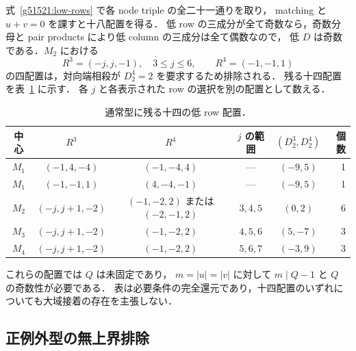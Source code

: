 式~\eqref{g51521:low-rows} で各 node triple の全二十一通りを取り，
matching と $u+v=0$ を課すと十八配置を得る．
低 row の三成分が全て奇数なら，奇数分母と pair products により低 column の三成分は全て偶数なので，
低 $D$ は奇数である．$M_2$ における
\[
 R^3=(-j,j,-1),\quad 3\le j\le6,\qquad R^4=(-1,-1,1)
\]
の四配置は，対向端相殺が $D^4_2=2$ を要求するため排除される．
残る十四配置を表~\ref{g51521:ordinary-row-table} に示す．
各 $j$ と各表示された row の選択を別の配置として数える．

\begin{table}[htbp]
\centering\small
\begin{tabular}{c|c|c|c|c|r}
中心&$R^3$&$R^4$&$j$ の範囲&$(D^3_2,D^4_2)$&個数\\\hline
$M_1$&$(-1,4,-4)$&$(-1,-4,4)$&---&$(-9,5)$&1\\
$M_1$&$(-1,-1,1)$&$(4,-4,-1)$&---&$(-9,5)$&1\\
$M_2$&$(-j,j+1,-2)$&$(-1,-2,2)$ または $(-2,-1,2)$&$3,4,5$&$(0,2)$&6\\
$M_3$&$(-j,j+1,-2)$&$(-1,-2,2)$&$4,5,6$&$(5,-7)$&3\\
$M_4$&$(-j,j+1,-2)$&$(-1,-2,2)$&$5,6,7$&$(-3,9)$&3
\end{tabular}
\caption{通常型に残る十四の低 row 配置．}\label{g51521:ordinary-row-table}
\end{table}

これらの配置では $Q$ は未固定であり，
$m=|u|=|v|$ に対して $m\mid Q-1$ と $Q$ の奇数性が必要である．
表は必要条件の完全還元であり，十四配置のいずれについても大域接着の存在を主張しない．

\subsection{正例外型の無上界排除}

